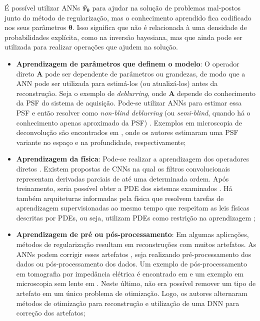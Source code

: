 É possível utilizar ANNs $\Psi_{\bm{\theta}}$ para ajudar na solução de problemas mal-postos junto do método de regularização, mas o conhecimento aprendido fica codificado nos seus parâmetros $\bm{\theta}$. Isso significa que não é relacionada à uma densidade de probabilidades explícita, como na inversão bayesiana, mas que ainda pode ser utilizada para realizar operações que ajudem na solução. 
\begin{itemize}

\item \textbf{Aprendizagem de parâmetros que definem o modelo}: O operador direto $\mathbf{A}$ pode ser dependente de parâmetros ou grandezas, de modo que a ANN pode ser utilizada para estimá-los (ou atualizá-los) antes da reconstrução. Seja o exemplo de \textit{deblurring}, onde $\mathbf{A}$ depende do conhecimento da PSF do sistema de aquisição. Pode-se utilizar ANNs para estimar essa PSF e então resolver como \textit{non-blind deblurring} (ou \textit{semi-blind}, quando há o conhecimento apenas aproximado da PSF) \cite[Figura 4]{Koh2021}. Exemplos em microscopia de deconvolução são encontrados em \cite{He2020, Shajkofci2020}, onde os autores estimaram uma PSF variante no espaço e na profundidade, respectivamente;

\item \textbf{Aprendizagem da física}: Pode-se realizar a aprendizagem dos operadores diretos \cite[pág. 105]{Arridge2019}. Existem propostas de CNNs na qual os filtros convolucionais representam derivadas parciais de até uma determinada ordem. Após treinamento, seria possível obter a PDE dos sistemas examinados \cite{Long2018}. Há também arquiteturas informadas pela física que resolvem tarefas de aprendizagem supervisionadas ao mesmo tempo que respeitam as leis físicas descritas por PDEs, ou seja, utilizam PDEs como restrição na aprendizagem \cite{Raissi2019}; 

\item \textbf{Aprendizagem de pré ou pós-processamento}: Em algumas aplicações, métodos de regularização resultam em reconstruções com muitos artefatos. As ANNs podem corrigir esses artefatos \cite[pág. 94]{Arridge2019}, seja realizando pré-processamento dos dados ou pós-processamento dos dados. Um exemplo de pós-processamento em tomografia por impedância elétrica é encontrado em \cite{Martin2017} e um exemplo em microscopia sem lente em \cite{Herv2020}. Neste último, não era possível remover um tipo de artefato em um único problema de otimização. Logo, os autores alternaram métodos de otimização para reconstrução e utilização de uma DNN para correção dos artefatos; 


\end{itemize}
